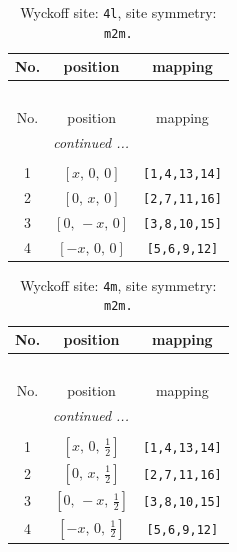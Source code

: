 \documentclass[fleqn,8pt]{jsarticle}
\begin{document}
\renewcommand{\arraystretch}{1.2}
\begin{longtable}{ccc}
\caption{Wyckoff site: {\tt 4l}, site symmetry: {\tt m2m.}}
 \\
 \hline \hline
No. & position & mapping \\ \hline \endfirsthead

\multicolumn{2}{l}{\tablename\ \thetable{}} \\
 \hline \hline
No. & position & mapping \\ \hline \endhead

 \hline \hline
\multicolumn{2}{r}{\footnotesize\it continued ...} \\ \endfoot

 \hline \hline
\multicolumn{2}{r}{} \\ \endlastfoot

1 & $\left[ x,\, 0,\, 0 \right]$ & {\tt [1,4,13,14]} \\ \hline
2 & $\left[ 0,\, x,\, 0 \right]$ & {\tt [2,7,11,16]} \\ \hline
3 & $\left[ 0,\, - x,\, 0 \right]$ & {\tt [3,8,10,15]} \\ \hline
4 & $\left[ - x,\, 0,\, 0 \right]$ & {\tt [5,6,9,12]} \\
\end{longtable}
\renewcommand{\arraystretch}{1.2}
\begin{longtable}{ccc}
\caption{Wyckoff site: {\tt 4m}, site symmetry: {\tt m2m.}}
 \\
 \hline \hline
No. & position & mapping \\ \hline \endfirsthead

\multicolumn{2}{l}{\tablename\ \thetable{}} \\
 \hline \hline
No. & position & mapping \\ \hline \endhead

 \hline \hline
\multicolumn{2}{r}{\footnotesize\it continued ...} \\ \endfoot

 \hline \hline
\multicolumn{2}{r}{} \\ \endlastfoot

1 & $\left[ x,\, 0,\, \frac{1}{2} \right]$ & {\tt [1,4,13,14]} \\ \hline
2 & $\left[ 0,\, x,\, \frac{1}{2} \right]$ & {\tt [2,7,11,16]} \\ \hline
3 & $\left[ 0,\, - x,\, \frac{1}{2} \right]$ & {\tt [3,8,10,15]} \\ \hline
4 & $\left[ - x,\, 0,\, \frac{1}{2} \right]$ & {\tt [5,6,9,12]} \\
\end{longtable}
\end{document}
